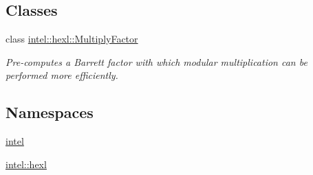 \subsection*{Classes}
\begin{DoxyCompactItemize}
\item 
class \hyperlink{classintel_1_1hexl_1_1MultiplyFactor}{intel\+::hexl\+::\+Multiply\+Factor}
\begin{DoxyCompactList}\small\item\em Pre-\/computes a Barrett factor with which modular multiplication can be performed more efficiently. \end{DoxyCompactList}\end{DoxyCompactItemize}
\subsection*{Namespaces}
\begin{DoxyCompactItemize}
\item 
 \hyperlink{namespaceintel}{intel}
\item 
 \hyperlink{namespaceintel_1_1hexl}{intel\+::hexl}
\end{DoxyCompactItemize}
